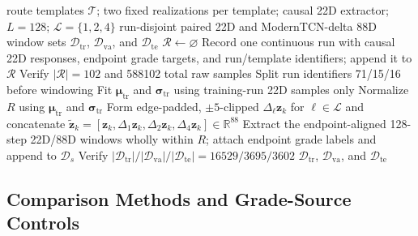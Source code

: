 \documentclass{ieeeaccess}
\begin{document}
\begin{algorithm}[!t]
\caption{Leakage-controlled construction of run-disjoint 22D and 88D datasets}
\label{alg:dataset_construction}
\begin{algorithmic}[1]
 route templates $\mathcal T$; two fixed realizations per template; causal 22D extractor; $L=128$; $\mathcal L=\{1,2,4\}$
\Ensure run-disjoint paired 22D and ModernTCN-delta 88D window sets $\mathcal D_{\mathrm{tr}}$, $\mathcal D_{\mathrm{va}}$, and $\mathcal D_{\mathrm{te}}$
\State $\mathcal R\gets\varnothing$
    \State Record one continuous run with causal 22D responses, endpoint grade targets, and run/template identifiers; append it to $\mathcal R$
\EndFor
\State Verify $|\mathcal R|=102$ and 588102 total raw samples
\State Split run identifiers 71/15/16 before windowing 
\State Fit $\boldsymbol\mu_{\mathrm{tr}}$ and $\boldsymbol\sigma_{\mathrm{tr}}$ using training-run 22D samples only
    \State Normalize $R$ using $\boldsymbol\mu_{\mathrm{tr}}$ and $\boldsymbol\sigma_{\mathrm{tr}}$
    \State Form edge-padded, $\pm5$-clipped $\Delta_{\ell}\mathbf z_k$ for $\ell\in\mathcal L$ and concatenate $\widetilde{\mathbf z}_k=[\mathbf z_k,\Delta_1\mathbf z_k,\Delta_2\mathbf z_k,\Delta_4\mathbf z_k]\in\mathbb R^{88}$
    \State Extract the endpoint-aligned 128-step 22D/88D windows wholly within $R$; attach endpoint grade labels and append to $\mathcal D_s$
\EndFor
\State Verify $|\mathcal D_{\mathrm{tr}}|/|\mathcal D_{\mathrm{va}}|/|\mathcal D_{\mathrm{te}}|=16529/3695/3602$
\State \Return $\mathcal D_{\mathrm{tr}}$, $\mathcal D_{\mathrm{va}}$, and $\mathcal D_{\mathrm{te}}$
\end{algorithmic}
\end{algorithm}

\subsection{Comparison Methods and Grade-Source Controls}
\end{document}
